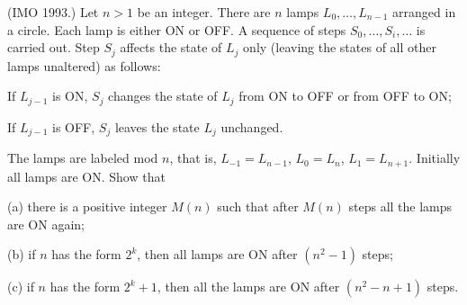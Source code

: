 (IMO 1993.) Let $n > 1$ be an integer. There are $n$ lamps $L_0, \ldots, L_{n-1}$ arranged in a circle. Each lamp is either ON or OFF. A sequence of steps $S_0, \ldots, S_i, \ldots$ is carried out. Step $S_j$ affects the state of $L_j$ only (leaving the states of all other lamps unaltered) as follows:

If $L_{j-1}$ is ON, $S_j$ changes the state of $L_j$ from ON to OFF or from OFF to ON;

If $L_{j-1}$ is OFF, $S_j$ leaves the state $L_j$ unchanged.

The lamps are labeled mod $n$, that is, $L_{-1} = L_{n-1}$, $L_0 = L_n$, $L_1 = L_{n+1}$. Initially all lamps are ON. Show that

(a) there is a positive integer $M(n)$ such that after $M(n)$ steps all the lamps are ON again;

(b) if $n$ has the form $2^k$, then all lamps are ON after $(n^2 - 1)$ steps;

(c) if $n$ has the form $2^k + 1$, then all the lamps are ON after $(n^2 - n + 1)$ steps.
